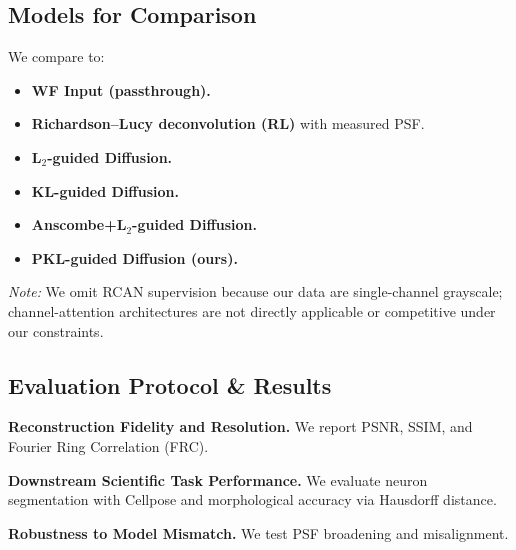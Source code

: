 \documentclass{article}
\begin{document}
\subsection{Models for Comparison}
We compare to:
\begin{itemize}
    \item \textbf{WF Input (passthrough).}
    \item \textbf{Richardson--Lucy deconvolution (RL)} with measured PSF.
    \item \textbf{L$_2$-guided Diffusion.}
    \item \textbf{KL-guided Diffusion.}
    \item \textbf{Anscombe+L$_2$-guided Diffusion.}
    \item \textbf{PKL-guided Diffusion (ours).}
\end{itemize}
\textit{Note:} We omit RCAN supervision because our data are single-channel grayscale; channel-attention architectures are not directly applicable or competitive under our constraints.

\subsection{Evaluation Protocol \& Results}
\textbf{Reconstruction Fidelity and Resolution.} We report PSNR, SSIM, and Fourier Ring Correlation (FRC).



\textbf{Downstream Scientific Task Performance.} We evaluate neuron segmentation with Cellpose and morphological accuracy via Hausdorff distance.


\textbf{Robustness to Model Mismatch.} We test PSF broadening and misalignment.


\end{document}

